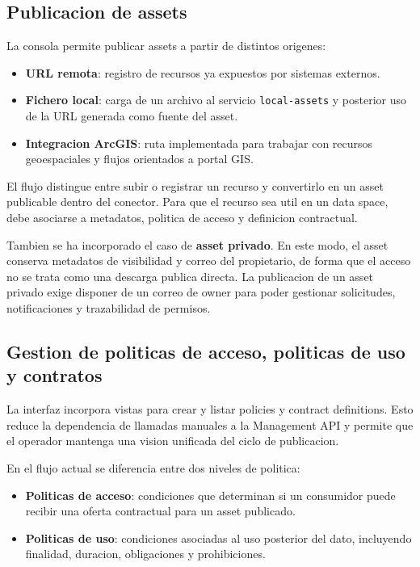 \documentclass{article}
\begin{document}
\subsection{Publicacion de assets}

La consola permite publicar assets a partir de distintos origenes:

\begin{itemize}[leftmargin=1.2cm]
    \item \textbf{URL remota}: registro de recursos ya expuestos por sistemas externos.
    \item \textbf{Fichero local}: carga de un archivo al servicio \texttt{local-assets} y posterior uso de la URL generada como fuente del asset.
    \item \textbf{Integracion ArcGIS}: ruta implementada para trabajar con recursos geoespaciales y flujos orientados a portal GIS.
\end{itemize}

El flujo distingue entre subir o registrar un recurso y convertirlo en un asset publicable dentro del conector. Para que el recurso sea util en un data space, debe asociarse a metadatos, politica de acceso y definicion contractual.

Tambien se ha incorporado el caso de \textbf{asset privado}. En este modo, el asset conserva metadatos de visibilidad y correo del propietario, de forma que el acceso no se trata como una descarga publica directa. La publicacion de un asset privado exige disponer de un correo de owner para poder gestionar solicitudes, notificaciones y trazabilidad de permisos.

\subsection{Gestion de politicas de acceso, politicas de uso y contratos}

La interfaz incorpora vistas para crear y listar policies y contract definitions. Esto reduce la dependencia de llamadas manuales a la Management API y permite que el operador mantenga una vision unificada del ciclo de publicacion.

En el flujo actual se diferencia entre dos niveles de politica:

\begin{itemize}[leftmargin=1.2cm]
    \item \textbf{Politicas de acceso}: condiciones que determinan si un consumidor puede recibir una oferta contractual para un asset publicado.
    \item \textbf{Politicas de uso}: condiciones asociadas al uso posterior del dato, incluyendo finalidad, duracion, obligaciones y prohibiciones.
\end{itemize}
\end{document}
